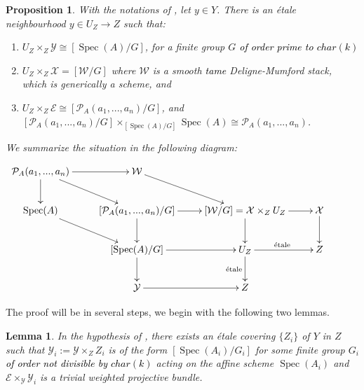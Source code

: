 \documentclass{amsart}
\newcommand{\cE}{\mathcal{E}}
\newcommand{\cP}{\mathcal{P}}
\newcommand{\cW}{\mathcal{W}}
\newcommand{\cX}{\mathcal{X}}
\newcommand{\cY}{\mathcal{Y}}
\newcommand{\spec}{\operatorname{Spec}}
\newtheorem{Lemma}[theorem]{Lemma}
\newtheorem{Prop}[theorem]{Proposition}
\theoremstyle{definition}
\begin{document}
\begin{Prop}\label{prop_reduction_to_quotient}
    With the notations of , let $y\in Y$. There is an \'etale neighbourhood $y \in U_Z \to Z$ such that:
    \begin{enumerate}
        \item $U_Z\times_Z \cY\cong [\spec(A)/G]$, for a finite group $G$ \textcolor{black}{of order prime to $char(k)$}
        \item $U_Z\times_Z\cX=[\cW/G]$ where $\cW$ is a smooth \textcolor{black}{tame} Deligne-Mumford stack, which is generically a scheme, and
        \item $U_Z\times_Z\cE\cong [\cP_A(a_1,...,a_n)/G]$, and $[\cP_A(a_1,...,a_n)/G]\times_{[\spec(A)/G]}\spec(A)\cong \cP_A(a_1,...,a_n)$. 
    \end{enumerate}
We summarize the situation in the following diagram:

$$
\xymatrix{\cP_A(a_1,...,a_n)\ar[dr]\ar[d] \ar[r] & \cW\ar[dr] & & &\\
           \spec(A)\ar[dr] & [\cP_A(a_1,...,a_n)/G] \ar[d] \ar[r] & [\cW/G]=\cX\times_ZU_Z\ar[r] \ar[d]& \cX\ar[d]&\\
           & [\spec(A)/G]\ar[r] \ar[d] & U_Z\ar[r]^{\text{\'etale}} \ar[d]_{\text{\'etale}} & Z&\\
           & \cY\ar[r] & Z&&}
$$
\end{Prop}
The proof will be in several steps, we begin with the following two lemmas.
\begin{Lemma}\label{lemma_extend_etale_covers}
    In the hypothesis of , there exists an \'etale covering $\{Z_i\}$ of $Y$ in $Z$ such that $\cY_i:=\cY \times_Z Z_i$ is of the form $[\spec (A_i)/G_i]$ for some finite group $G_i$ \textcolor{black}{of order not divisible by $char(k)$} acting on the affine scheme $\spec (A_i)$ and $\cE \times_{\cY} \cY_i$ is a trivial weighted projective bundle.
\end{Lemma}
\end{document}
